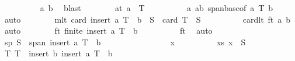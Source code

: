 \begin{isabellebody}
\ \ \ \ \ \ \ \ \isamarkupfalse%
\ a\ b\ \isamarkupfalse%
\ blast\isanewline
\ \ \ \ \ \ \isamarkupfalse%
\ at{\isacharcolon}{\kern0pt}\ {\isachardoublequoteopen}a\ {\isasymnotin}\ T{\isachardoublequoteclose}\isanewline
\ \ \ \ \ \ \ \ \isamarkupfalse%
\ a\ ab\ span{\isacharunderscore}{\kern0pt}base{\isacharbrackleft}{\kern0pt}of\ a\ {\isachardoublequoteopen}T{\isacharminus}{\kern0pt}\ {\isacharbraceleft}{\kern0pt}b{\isacharbraceright}{\kern0pt}{\isachardoublequoteclose}{\isacharbrackright}{\kern0pt}\ \isamarkupfalse%
\ auto\isanewline
\ \ \ \ \ \ \isamarkupfalse%
\ mlt{\isacharcolon}{\kern0pt}\ {\isachardoublequoteopen}card\ {\isacharparenleft}{\kern0pt}{\isacharparenleft}{\kern0pt}insert\ a\ {\isacharparenleft}{\kern0pt}T\ {\isacharminus}{\kern0pt}\ {\isacharbraceleft}{\kern0pt}b{\isacharbraceright}{\kern0pt}{\isacharparenright}{\kern0pt}{\isacharparenright}{\kern0pt}\ {\isacharminus}{\kern0pt}\ S{\isacharparenright}{\kern0pt}\ {\isacharless}{\kern0pt}\ card\ {\isacharparenleft}{\kern0pt}T\ {\isacharminus}{\kern0pt}\ S{\isacharparenright}{\kern0pt}{\isachardoublequoteclose}\isanewline
\ \ \ \ \ \ \ \ \isamarkupfalse%
\ cardlt\ ft\ a\ b\ \isamarkupfalse%
\ auto\isanewline
\ \ \ \ \ \ \isamarkupfalse%
\ ft{\isacharprime}{\kern0pt}{\isacharcolon}{\kern0pt}\ {\isachardoublequoteopen}finite\ {\isacharparenleft}{\kern0pt}insert\ a\ {\isacharparenleft}{\kern0pt}T\ {\isacharminus}{\kern0pt}\ {\isacharbraceleft}{\kern0pt}b{\isacharbraceright}{\kern0pt}{\isacharparenright}{\kern0pt}{\isacharparenright}{\kern0pt}{\isachardoublequoteclose}\isanewline
\ \ \ \ \ \ \ \ \isamarkupfalse%
\ ft\ \isamarkupfalse%
\ auto\isanewline
\ \ \ \ \ \ \isamarkupfalse%
\ sp{\isacharprime}{\kern0pt}{\isacharcolon}{\kern0pt}\ {\isachardoublequoteopen}S\ {\isasymsubseteq}\ span\ {\isacharparenleft}{\kern0pt}insert\ a\ {\isacharparenleft}{\kern0pt}T\ {\isacharminus}{\kern0pt}\ {\isacharbraceleft}{\kern0pt}b{\isacharbraceright}{\kern0pt}{\isacharparenright}{\kern0pt}{\isacharparenright}{\kern0pt}{\isachardoublequoteclose}\isanewline
\ \ \ \ \ \ \isamarkupfalse%
\isanewline
\ \ \ \ \ \ \ \ \isamarkupfalse%
\ x\isanewline
\ \ \ \ \ \ \ \ \isamarkupfalse%
\ xs{\isacharcolon}{\kern0pt}\ {\isachardoublequoteopen}x\ {\isasymin}\ S{\isachardoublequoteclose}\isanewline
\ \ \ \ \ \ \ \ \isamarkupfalse%
\ T{\isacharcolon}{\kern0pt}\ {\isachardoublequoteopen}T\ {\isasymsubseteq}\ insert\ b\ {\isacharparenleft}{\kern0pt}insert\ a\ {\isacharparenleft}{\kern0pt}T\ {\isacharminus}{\kern0pt}\ {\isacharbraceleft}{\kern0pt}b{\isacharbraceright}{\kern0pt}{\isacharparenright}{\kern0pt}{\isacharparenright}{\kern0pt}{\isachardoublequoteclose}\isanewline

\end{isabellebody}
